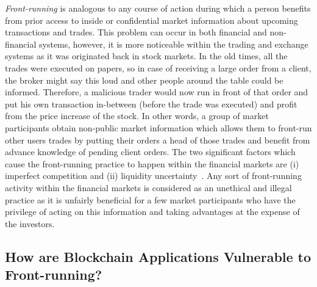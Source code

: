 \emph{Front-running} is analogous to any course of action during which a person benefits from prior access to inside or confidential market information about upcoming transactions and trades. This problem can occur in both financial and non-financial systems, however, it is more noticeable within the trading and exchange systems as it was originated back in stock markets. In the old times, all the trades were executed on papers, so in case of receiving a large order from a client, the broker might say this loud and other people around the table could be informed. Therefore, a malicious trader would now run in front of that order and put his own transaction in-between (before the trade was executed) and profit from the price increase of the stock. In other words, a group of market participants obtain non-public market information which allows them to front-run other users trades by putting their orders a head of those trades and benefit from advance knowledge of pending client orders. The two significant factors which cause the front-running practice to happen within the financial markets are (i) imperfect competition and (ii) liquidity uncertainty~\cite{liang2005distressed}. Any sort of front-running activity within the financial markets is considered as an unethical and illegal practice as it is unfairly beneficial for a few market participants who have the privilege of acting on this information and taking advantages at the expense of the investors. 






\subsection{How are Blockchain Applications Vulnerable to Front-running?} %
\label{sec:Front Running on the Blockchains}


